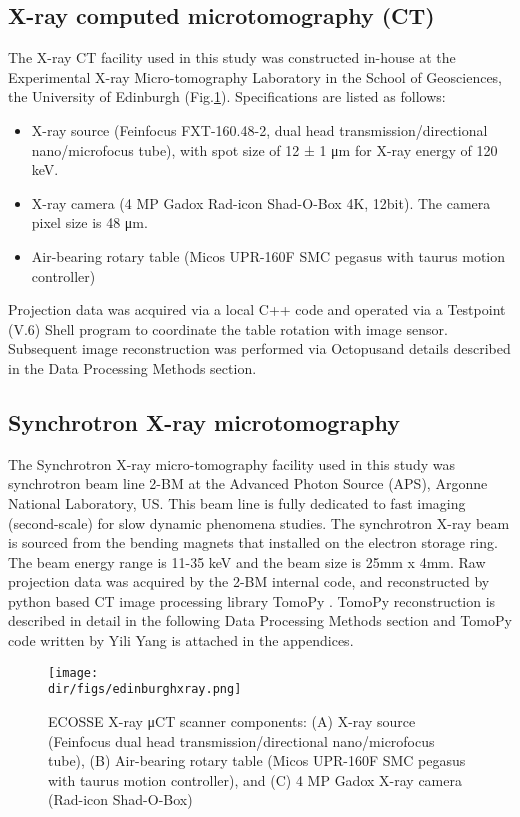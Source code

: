 \subsection{X-ray computed microtomography (\textmu CT)}
The X-ray \textmu CT facility used in this study was constructed in-house at the Experimental X-ray Micro-tomography Laboratory in the School of Geosciences, the University of Edinburgh (Fig.\ref{edinburghxray}). Specifications are listed as follows:

\begin{itemize}
 \item X-ray source (Feinfocus FXT-160.48-2, dual head transmission/directional nano/microfocus tube), with spot size of 12 ± 1 μm for X-ray energy of 120 keV. 
 \item X-ray camera (4 MP Gadox Rad-icon Shad-O-Box 4K, 12bit). The camera pixel size is 48 μm.
 \item Air-bearing rotary table (Micos UPR-160F SMC pegasus  with taurus motion controller)
\end{itemize}

Projection data was acquired via a local C++ code and operated via a Testpoint (V.6) Shell program to coordinate the table rotation with image sensor. Subsequent image reconstruction was performed via Octopus\texttrademark and details described in the Data Processing Methods section.

\subsection{Synchrotron X-ray microtomography}
The Synchrotron X-ray micro-tomography facility used in this study was synchrotron beam line 2-BM at the Advanced Photon Source (APS), Argonne National Laboratory, US. This beam line is fully dedicated to fast imaging (second-scale) for slow dynamic phenomena studies. The synchrotron X-ray beam is sourced from the bending magnets that installed on the electron storage ring. The beam energy range is 11-35 keV and the beam size is 25mm x 4mm. Raw projection data was acquired by the 2-BM internal code, and reconstructed by python based CT image processing library TomoPy \citep{gursoy2014tomopy}. TomoPy reconstruction is described in detail in the following Data Processing Methods section and TomoPy code written by Yili Yang is attached in the appendices.

\begin{figure}[htbp]
  \centering
  \texttt{[image: \\dir/figs/edinburghxray.png]}
  \caption{ECOSSE X-ray μCT scanner components: (A) X-ray source (Feinfocus dual head transmission/directional nano/microfocus tube), (B) Air-bearing rotary table (Micos UPR-160F SMC pegasus with taurus motion controller), and (C) 4 MP Gadox X-ray camera (Rad-icon Shad-O-Box)}
  \label{edinburghxray}
\end{figure}

